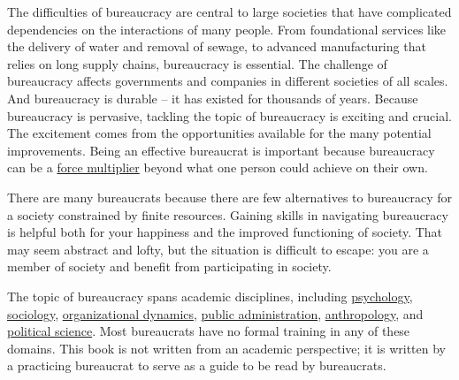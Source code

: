 


The difficulties of bureaucracy are central to large societies that have complicated dependencies on the interactions of many people. From foundational services like the delivery of water and removal of sewage, to advanced manufacturing that relies on long supply chains, bureaucracy is essential.  The challenge of bureaucracy affects governments and companies in different societies of all scales. And bureaucracy is durable -- it has existed for thousands of years. Because bureaucracy is pervasive, tackling the topic of bureaucracy is exciting and crucial. The excitement comes from the opportunities available for the many potential improvements.
Being an effective bureaucrat is important because bureaucracy can be a \href{https://en.wikipedia.org/wiki/Force_multiplication}{force multiplier}\iftoggle{WPinmargin}{\marginpar{$>$Wikipedia: Force multiplication}}{}
beyond what one person could achieve on their own.

There are many bureaucrats because there are few alternatives to bureaucracy for a society constrained by finite resources. Gaining skills in navigating bureaucracy is helpful both for your happiness and the improved functioning of society. That may seem abstract and lofty, but the situation is difficult to escape: you are a member of society and benefit from participating in society. 


The topic of bureaucracy spans academic disciplines, including \href{https://en.wikipedia.org/wiki/Psychology}{psychology},
\iftoggle{WPinmargin}{\marginpar{$>$Wikipedia: psychology}}{}
\href{https://en.wikipedia.org/wiki/Sociology}{sociology},
\href{https://en.wikipedia.org/wiki/Organizational_behavior}{organizational dynamics},
\href{https://en.wikipedia.org/wiki/Public_administration}{public administration}, 
\href{https://en.wikipedia.org/wiki/Anthropology}{anthropology},
and  
\href{https://en.wikipedia.org/wiki/Political_science}{political science}. 
Most bureaucrats have no formal training in any of these domains. This book is not written from an academic perspective; it is written by a practicing bureaucrat to serve as a guide to be read by bureaucrats. 



